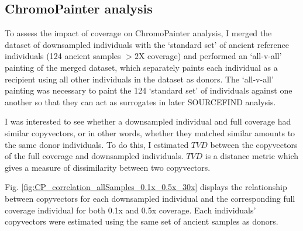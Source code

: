 \subsection{ChromoPainter analysis} \label{sec:ChromoPainterChap2}

To assess the impact of coverage on ChromoPainter analysis, I merged the dataset of downsampled individuals with the `standard set' of ancient reference individuals (124 ancient samples $>2$X coverage) and performed an `all-v-all' painting of the merged dataset, which separately paints each individual as a recipient using all other individuals in the dataset as donors. The `all-v-all' painting was necessary to paint the 124 `standard set' of individuals against one another so that they can act as surrogates in later SOURCEFIND analysis. 

I was interested to see whether a downsampled individual and full coverage had similar copyvectors, or in other words, whether they matched similar amounts to the same donor individuals. To do this, I estimated $TVD$ between the copyvectors of the full coverage and downsampled individuals. $TVD$ is a distance metric which gives a measure of dissimilarity between two copyvectors.

Fig. \ref{fig:CP_correlation_allSamples_0.1x_0.5x_30x} displays the relationship between copyvectors for each downsampled individual and the corresponding full coverage individual for both 0.1x and 0.5x coverage. Each individuals' copyvectors were estimated using the same set of ancient samples as donors.

